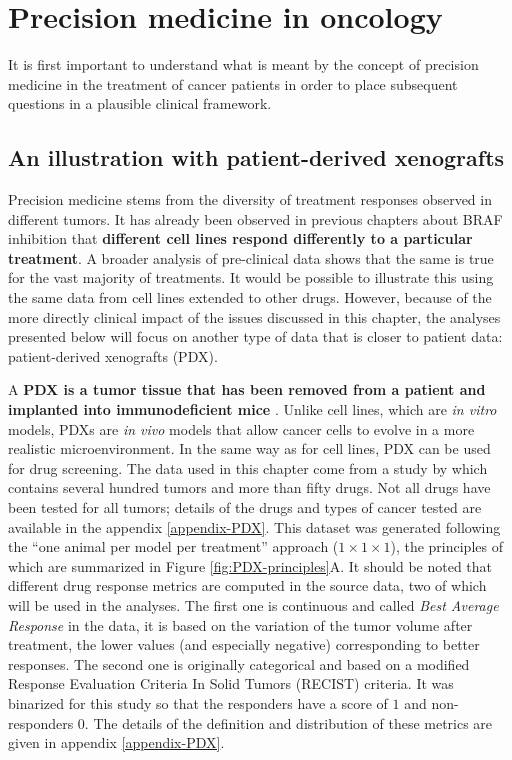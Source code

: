 \documentclass[a4paper,12pt,twoside,onecolumn,openright,final,oldfontcommands]{memoir}
\begin{document}
\section{Precision medicine in
oncology}\label{precision-medicine-in-oncology}

It is first important to understand what is meant by the concept of
precision medicine in the treatment of cancer patients in order to place
subsequent questions in a plausible clinical framework.

\subsection{An illustration with patient-derived
xenografts}\label{main-PDX}

Precision medicine stems from the diversity of treatment responses
observed in different tumors. It has already been observed in previous
chapters about BRAF inhibition that \textbf{different cell lines respond
differently to a particular treatment}. A broader analysis of
pre-clinical data shows that the same is true for the vast majority of
treatments. It would be possible to illustrate this using the same data
from cell lines extended to other drugs. However, because of the more
directly clinical impact of the issues discussed in this chapter, the
analyses presented below will focus on another type of data that is
closer to patient data: patient-derived xenografts (PDX).

A \textbf{PDX is a tumor tissue that has been removed from a patient and
implanted into immunodeficient mice} \citep{hidalgo2014patient}. Unlike
cell lines, which are \emph{in vitro} models, PDXs are \emph{in vivo}
models that allow cancer cells to evolve in a more realistic
microenvironment. In the same way as for cell lines, PDX can be used for
drug screening. The data used in this chapter come from a study by
\citet{gao2015high} which contains several hundred tumors and more than
fifty drugs. Not all drugs have been tested for all tumors; details of
the drugs and types of cancer tested are available in the appendix
\ref{appendix-PDX}. This dataset was generated following the ``one
animal per model per treatment'' approach (\(1 \times 1 \times 1\)), the
principles of which are summarized in Figure \ref{fig:PDX-principles}A.
It should be noted that different drug response metrics are computed in
the source data, two of which will be used in the analyses. The first
one is continuous and called \emph{Best Average Response} in the data,
it is based on the variation of the tumor volume after treatment, the
lower values (and especially negative) corresponding to better
responses. The second one is originally categorical and based on a
modified Response Evaluation Criteria In Solid Tumors (RECIST) criteria.
It was binarized for this study so that the responders have a score of
\(1\) and non-responders \(0\). The details of the definition and
distribution of these metrics are given in appendix \ref{appendix-PDX}.
\end{document}
